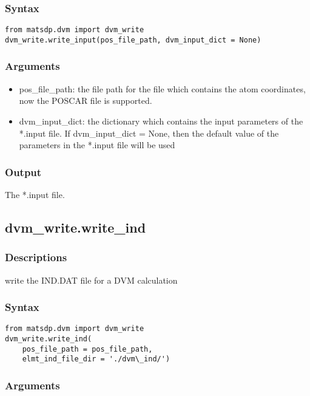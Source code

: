 \documentclass[12pt]{book}
\begin{document}
\subsubsection{Syntax}
\begin{lstlisting}
from matsdp.dvm import dvm_write
dvm_write.write_input(pos_file_path, dvm_input_dict = None)
\end{lstlisting}

\subsubsection{Arguments}

\begin{itemize}
\item pos\_file\_path: the file path for the file which contains the atom coordinates, now the POSCAR file is supported.
\item dvm\_input\_dict: the dictionary which contains the input parameters of the *.input file. If dvm\_input\_dict = None, then the default value of the parameters in the *.input file will be used
\end{itemize}


\subsubsection{Output}

The *.input file.

\subsection{dvm\_write.write\_ind}
\subsubsection{Descriptions}
write the IND.DAT file for a DVM calculation

\subsubsection{Syntax}
\begin{lstlisting}
from matsdp.dvm import dvm_write
dvm_write.write_ind(
    pos_file_path = pos_file_path, 
    elmt_ind_file_dir = './dvm\_ind/')
\end{lstlisting}

\subsubsection{Arguments}
\end{document}
